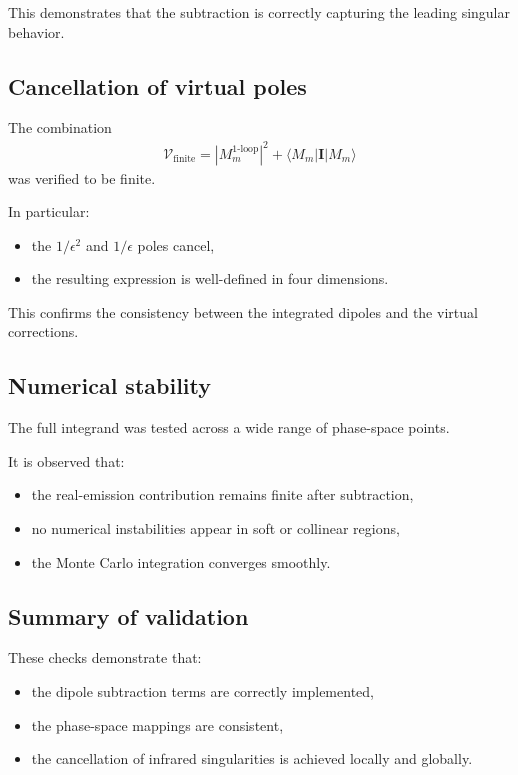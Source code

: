 This demonstrates that the subtraction is correctly capturing the
leading singular behavior.

\subsection{Cancellation of virtual poles}

The combination
\begin{align}
\mathcal{V}_{\text{finite}} =
|M_m^{\text{1-loop}}|^2 + \langle M_m | \mathbf{I} | M_m \rangle
\end{align}
was verified to be finite.

In particular:
\begin{itemize}
    \item the $1/\epsilon^2$ and $1/\epsilon$ poles cancel,
    \item the resulting expression is well-defined in four dimensions.
\end{itemize}

This confirms the consistency between the integrated dipoles and
the virtual corrections.

\subsection{Numerical stability}

The full integrand was tested across a wide range of phase-space points.

It is observed that:
\begin{itemize}
    \item the real-emission contribution remains finite after subtraction,
    \item no numerical instabilities appear in soft or collinear regions,
    \item the Monte Carlo integration converges smoothly.
\end{itemize}

\subsection{Summary of validation}

These checks demonstrate that:
\begin{itemize}
    \item the dipole subtraction terms are correctly implemented,
    \item the phase-space mappings are consistent,
    \item the cancellation of infrared singularities is achieved locally
    and globally.
\end{itemize}